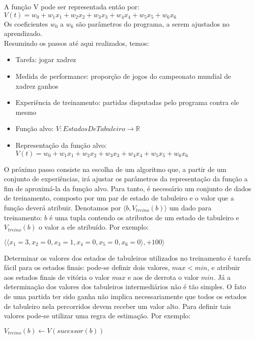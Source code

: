 A função V pode ser representada então por:
\\
$V(t) = w_0 + w_1 x_1 + w_2 x_2 + w_3 x_3 + w_4 x_4 + w_5 x_5 + w_6 x_6$
\\
Os coeficientes $w_0$ a $w_6$ são parâmetros do programa, a serem ajustados no aprendizado.
\\
Resumindo os passos até aqui realizados, temos:

\begin{itemize}
\item Tarefa: jogar xadrez
\item Medida de performance: proporção de jogos do campeonato mundial de xadrez ganhos
\item Experiência de treinamento: partidas disputadas pelo programa contra ele mesmo
\item Função alvo: $V:EstadosDeTabuleiro \rightarrow \mathbb{R}$
\item Representação da função alvo: $V(t) = w_0 + w_1 x_1 + w_2 x_2 + w_3 x_3 + w_4 x_4 + w_5 x_5 + w_6 x_6$
\end{itemize}


O próximo passo consiste na escolha de um algoritmo que, a partir de um conjunto de experiências, irá ajustar os parâmetros da representação da função a fim de aproximá-la da função alvo. Para tanto, é necessário um conjunto de dados de treinamento, composto por um par de estado de tabuleiro e o valor que a função deverá atribuir. Denotamos por $\langle b, V_{treino}(b) \rangle $ um dado para treinamento: $b$ é uma tupla contendo os atributos de um estado de tabuleiro e $V_{treino}(b)$ o valor a ele atribuído. Por exemplo:

$\langle \langle x_1 = 3, x_2 = 0, x_3 = 1, x_4 = 0, x_5 = 0, x_6 = 0 \rangle, +100\rangle$

Determinar os valores dos estados de tabuleiros utilizados no treinamento é tarefa fácil para os estados finais: pode-se definir dois valores, $max < min$, e atribuir aos estados finais de vitória o valor $max$ e aos de derrota o valor $min$. Já a determinação dos valores dos tabuleiros intermediários não é tão simples. O fato de uma partida ter sido ganha não implica necessariamente que todos os estados de tabuleiro nela percorridos devem receber um valor alto. Para definir tais valores pode-se utilizar uma regra de estimação. Por exemplo:

$V_{treino}(b) \leftarrow V(sucessor(b))$

